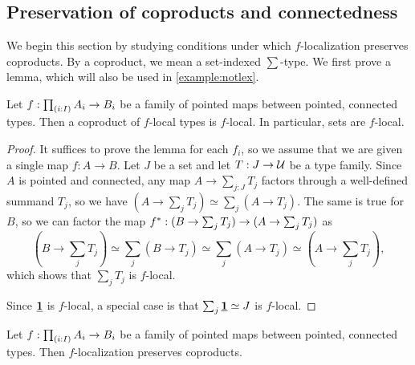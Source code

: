 
\subsection{Preservation of coproducts and connectedness}\label{ss:connectedness}

We begin this section by studying conditions under which
$f$-localization preserves coproducts. 
By a coproduct, we mean a set-indexed $\sum$-type.
We first prove a lemma, which will also be used in \cref{example:notlex}.

\begin{lem}\label{lemma:setsarelocal}
    Let $f : \prd{i:I} A_i \to B_i$ be a family of pointed maps
    between pointed, connected types.
    Then a coproduct of $f$-local types is $f$-local.
    In particular, sets are $f$-local.
\end{lem}

\begin{proof}
    It suffices to prove the lemma for each $f_i$, so we assume
    that we are given a single map $f : A \to B$.
    Let $J$ be a set and let $T : J \to \mathcal{U}$ be a type family.
    Since $A$ is pointed and connected, any map $A \to \sum_{j:J} T_j$ factors through a well-defined summand
    $T_j$, so we have $(A \to \sum_j T_j) \simeq \sum_j (A \to T_j)$. The same is true for $B$, so
    we can factor the map ${f}^\ast : (B \to \sum_j T_j) \to (A \to \sum_j T_j)$ as
    \[
        \left(B \to \sum_j T_j \right) \simeq \sum_j (B \to T_j) \simeq \sum_j (A \to T_j) \simeq \left(A \to \sum_j T_j\right),
    \]
    which shows that $\sum_j T_j$ is $f$-local.

    Since $\underline{\mathbf{1}}$ is $f$-local, a special case is that $\sum_j \underline{\mathbf{1}} \simeq J$ is $f$-local.
\end{proof}

\begin{cor}
    Let $f : \prd{i:I} A_i \to B_i$ be a family of pointed maps
    between pointed, connected types.
    Then $f$-localization preserves coproducts.
\end{cor}

